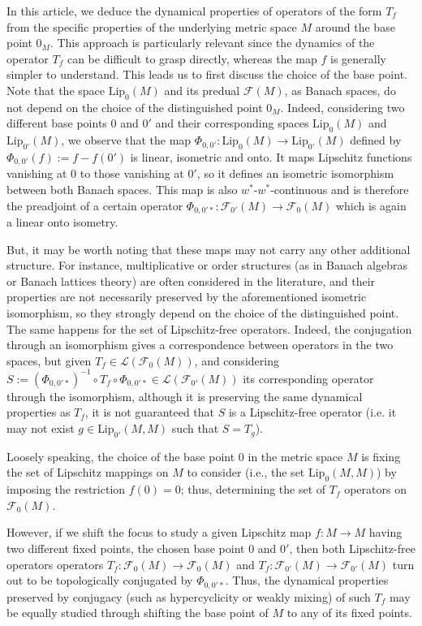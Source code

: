 \documentclass[12pt,english]{amsart}
\numberwithin{equation}{section}
\theoremstyle{plain}
\theoremstyle{definition}
\newcommand{\free}[1]{\mathcal{F}(#1)}
\def\lip{ \text{Lip}}
\begin{document}
    In this article, we deduce the dynamical properties of operators of the form $T_f$ from the specific properties of the underlying metric space $M$ around the base point $0_M$. This approach is particularly relevant since the dynamics of the operator $T_f$ can be difficult to grasp directly, whereas the map $f$ is generally simpler to understand. This leads us to first discuss the choice of the base point. Note that the space $\lip_0(M)$ and its predual $\free{M}$, as Banach spaces, do not depend on the choice of the distinguished point $0_M$. Indeed, considering two different base points $0$ and $0'$  and their corresponding spaces $\lip_0(M)$ and $\lip_{0'}(M)$, we observe that the map $\Phi_{0,0'}\colon \lip_0(M) \to \lip_{0'}(M)$ defined by $\Phi_{0,0'}(f):= f-f(0') $ is linear, isometric and onto. It maps Lipschitz functions vanishing at $0$ to those vanishing at $0'$, so it defines an isometric isomorphism between both Banach spaces. This map is also $w^*$-$w^*$-continuous and is therefore the preadjoint of a certain operator $\Phi_{0,0'*}\colon \mathcal{F}_{0'}(M) \to \mathcal{F}_0(M)$ which is again a linear onto isometry. 
    
    But, it may be worth noting that these maps may not carry any other additional structure. For instance, multiplicative or order structures (as in Banach algebras or Banach lattices theory) are often considered in the literature, and their properties are not necessarily preserved by the aforementioned isometric isomorphism, so they strongly depend on the choice of the distinguished point. The same happens for the set of Lipschitz-free operators. Indeed, the conjugation through an isomorphism gives a correspondence between operators in the two spaces, but given $T_f\in \mathcal{L}(\mathcal{F}_0(M))$, and considering $S:= (\Phi_{0,0'*})^{-1}\circ T_f\circ \Phi_{0,0'*} \in \mathcal{L}(\mathcal{F}_{0'}(M)) $  its corresponding operator through the isomorphism, although it is preserving the same dynamical properties as $T_f$, it is not guaranteed that $S$ is a Lipschitz-free operator (i.e. it may not exist $g\in \lip_{0'}(M,M)$ such that $S= T_g$). 
    
    Loosely speaking, the choice of the base point $0$ in the metric space $M$ is fixing the set of Lipschitz mappings on $M$ to consider (i.e., the set $\lip_0(M,M)$) by imposing the restriction $f(0)=0$; thus, determining the set of $T_f$ operators on $\mathcal{F}_0(M)$. 
    
    However, if we shift the focus to study a given Lipschitz map $f\colon M\to M$ having two different fixed points, the chosen base point $0$ and $0'$, then both Lipschitz-free operators operators $T_f\colon \mathcal{F}_0(M)\to \mathcal{F}_0(M)$ and $T_f\colon \mathcal{F}_{0'}(M)\to \mathcal{F}_{0'}(M)$ turn out to be topologically conjugated by $\Phi_{0,0'*}$. Thus, the dynamical properties preserved by conjugacy (such as hypercyclicity or weakly mixing)  of such $T_f$ may be equally studied through shifting the base point of $M$ to any of its fixed points. 
\end{document}
